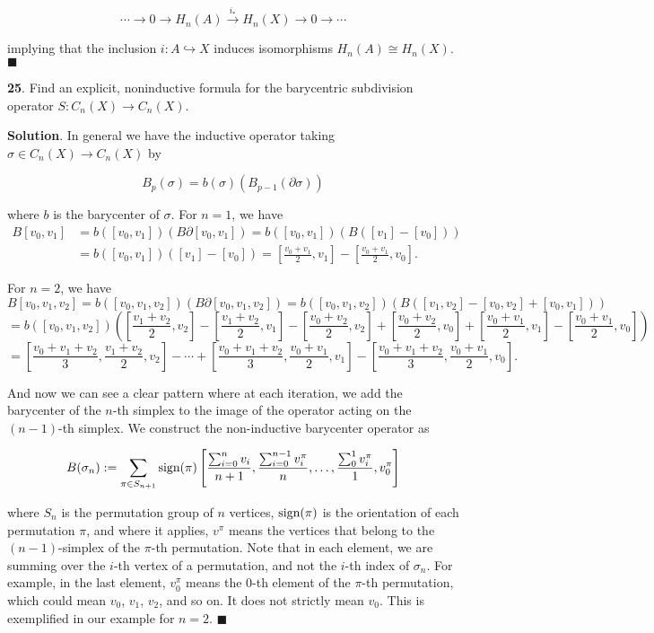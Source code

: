 \documentclass{article}
\begin{document}
$$\cdots\to  0\to H_{n}(A)\xrightarrow{i_{\ast}} H_{n}(X)\to 0\to \cdots $$

implying that the inclusion $i: A\hookrightarrow X$ induces isomorphisms $H_{n}(A)\cong H_{n}(X)$. $\blacksquare$
\bigskip
\bigskip

\textbf{25}. Find an explicit, noninductive formula for the barycentric subdivision operator $S:C_{n}(X)\to C_{n}(X)$.
\medskip

\textbf{Solution}. In general we have the inductive operator taking $\sigma\in C_{n}(X)\to C_{n}(X)$ by

$$B_{p}(\sigma) = b(\sigma)\left(B_{p-1}(\partial\sigma)\right)$$

where $b$ is the barycenter of $\sigma$. For $n = 1$, we have
\begin{align*}
B[v_{0}, v_{1}] &= b([v_{0}, v_{1}])(B\partial [v_{0}, v_{1}]) = b([v_{0}, v_{1}])(B([v_{1}]-[v_{0}]))\\ &= b([v_{0}, v_{1}])([v_{1}]-[v_{0}]) = \left[\frac{v_{0}+v_{1}}{2}, v_{1}\right] - \left[\frac{v_{0}+v_{1}}{2}, v_{0}\right].
\end{align*}

For $n = 2$, we have
$$B[v_{0}, v_{1}, v_{2}] = b([v_{0}, v_{1}, v_{2}])(B\partial [v_{0}, v_{1}, v_{2}]) = b([v_{0}, v_{1}, v_{2}])(B([v_{1}, v_{2}]-[v_{0}, v_{2}] + [v_{0}, v_{1}]))$$
$$= b([v_{0}, v_{1}, v_{2}])\left(\left[\frac{v_{1}+v_{2}}{2}, v_{2}\right] - \left[\frac{v_{1}+v_{2}}{2}, v_{1}\right] - \left[\frac{v_{0}+v_{2}}{2}, v_{2}\right] + \left[\frac{v_{0}+v_{2}}{2}, v_{0}\right] + \left[\frac{v_{0}+v_{1}}{2}, v_{1}\right] - \left[\frac{v_{0}+v_{1}}{2}, v_{0}\right]\right)$$
$$= \left[\frac{v_{0}+v_{1}+v_{2}}{3},\frac{v_{1}+v_{2}}{2}, v_{2}\right] - \cdots + \left[\frac{v_{0}+v_{1}+v_{2}}{3}, \frac{v_{0}+v_{1}}{2}, v_{1}\right] - \left[\frac{v_{0}+v_{1}+v_{2}}{3}, \frac{v_{0}+v_{1}}{2}, v_{0}\right].$$

And now we can see a clear pattern where at each iteration, we add the barycenter of the $n$-th simplex to the image of the operator acting on the $(n-1)$-th simplex. We construct the non-inductive barycenter operator as 

$$B(\sigma_{n}) := \sum_{\pi \in S_{n+1}} \textnormal{sign}(\pi) \left[\frac{\sum_{i=0}^{n} v_{i}}{n+1}, \frac{\sum_{i=0}^{n-1} v^{\pi}_{i}}{n}, \ldots, \frac{\sum_{0}^{1} v^{\pi}_{i}}{1}, v^{\pi}_{0}\right]$$

where $S_{n}$ is the permutation group of $n$ vertices, $\textnormal{sign}(\pi)$ is the orientation of each permutation $\pi$, and where it applies, $v^{\pi}$ means the vertices that belong to the $(n-1)$-simplex of the $\pi$-th permutation. Note that in each element, we are summing over the $i$-th vertex of a permutation, and not the $i$-th index of $\sigma_{n}$. For example, in the last element, $v^{\pi}_{0}$ means the 0-th element of the $\pi$-th permutation, which could mean $v_{0}$, $v_{1}$, $v_{2}$, and so on. It does not strictly mean $v_{0}$. This is exemplified in our example for $n = 2$. $\blacksquare$
\bigskip
\bigskip
\end{document}
